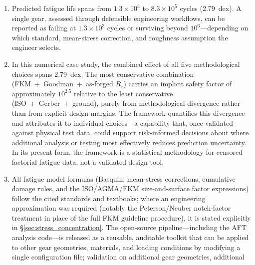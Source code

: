\documentclass[twocolumn,12pt,a4paper]{article}
\begin{document}
\begin{enumerate}
        near-zero result is therefore not a finding about the
        unimportance of S--N curves in general, but about the
        specific contrast between the two datasets selected.
        The cumulative damage rule contributes 0.3\% under
        constant-amplitude loading; this figure must not be extrapolated
        to variable-amplitude spectra, where sequence effects and
        damage-rule differences could produce substantially larger
        divergence.
  \item Predicted fatigue life spans from $1.3\times10^3$ to
        $8.3\times10^5$ cycles (2.79~dex). A single gear, assessed
        through defensible engineering workflows, can be reported as
        failing at $1.3\times10^3$ cycles or surviving beyond $10^6$---depending on
        which standard, mean-stress correction, and roughness
        assumption the engineer selects.
  \item In this numerical case study, the combined effect of all five
        methodological choices spans 2.79~dex. The most conservative
        combination (FKM~+~Goodman~+~as-forged $R_z$) carries an
        implicit safety factor of approximately $10^{2.5}$ relative to
        the least conservative (ISO~+~Gerber~+~ground), purely from
        methodological divergence rather than from explicit design
        margins. The framework quantifies this divergence and attributes
        it to individual choices---a capability that, once validated
        against physical test data, could support risk-informed
        decisions about where additional analysis or testing most
        effectively reduces prediction uncertainty. In its present
        form, the framework is a statistical methodology for censored
        factorial fatigue data, not a validated design tool.
  \item All fatigue model formulas (Basquin, mean-stress corrections,
        cumulative damage rules, and the ISO/AGMA/FKM size-and-surface
        factor expressions) follow the cited standards and textbooks;
        where an engineering approximation was required (notably the
        Peterson/Neuber notch-factor treatment in place of the full FKM
        guideline procedure), it is stated explicitly in
        \S\ref{sec:stress_concentration}. The open-source pipeline---including
        the AFT analysis code---is released as a reusable, auditable
        toolkit that can be applied to other gear geometries, materials,
        and loading conditions by modifying a single configuration
        file; validation on additional gear geometries, additional

\end{enumerate}
\end{document}
